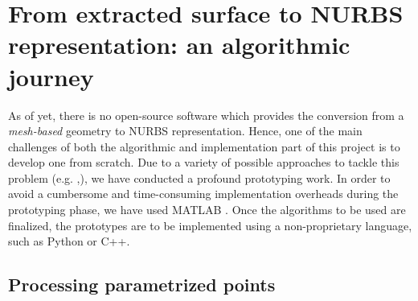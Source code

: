 \section{From extracted surface to NURBS representation: an algorithmic journey}
As of yet, there is no open-source software which provides the conversion from a \textit{mesh-based} geometry to NURBS representation. Hence, one of the main challenges of both the algorithmic and implementation part of this project is to develop one from scratch. Due to a variety of possible approaches to tackle this problem (e.g. \cite{becker2011advanced},\cite{eck1996automatic}), we have conducted a profound prototyping work. In order to avoid a cumbersome and time-consuming implementation overheads during the prototyping phase, we have used MATLAB \cite{MATLAB}. Once the algorithms to be used are finalized, the prototypes are to be implemented using a non-proprietary language, such as Python or C++.

\subsection{Processing parametrized points}



